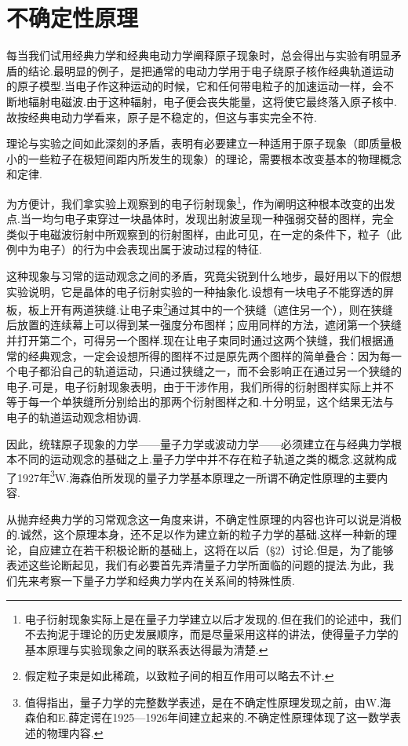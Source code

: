 \section{不确定性原理}

每当我们试用经典力学和经典电动力学阐释原子现象时，总会得出与实验有明显矛盾的结论.最明显的例子，是把通常的电动力学用于电子绕原子核作经典轨道运动的原子模型.当电子作这种运动的时候，它和任何带电粒子的加速运动一样，会不断地辐射电磁波.由于这种辐射，电子便会丧失能量，这将使它最终落入原子核中.故按经典电动力学看来，原子是不稳定的，但这与事实完全不符.

理论与实验之间如此深刻的矛盾，表明有必要建立一种适用于原子现象（即质量极小的一些粒子在极短间距内所发生的现象）的理论，需要根本改变基本的物理概念和定律.

为方便计，我们拿实验上观察到的电子衍射现象\footnote{电子衍射现象实际上是在量子力学建立以后才发现的.但在我们的论述中，我们不去拘泥于理论的历史发展顺序，而是尽量采用这样的讲法，使得量子力学的基本原理与实验现象之间的联系表达得最为清楚.}，作为阐明这种根本改变的出发点.当一均匀电子束穿过一块晶体时，发现出射波呈现一种强弱交替的图样，完全类似于电磁波衍射中所观察到的衍射图样，由此可见，在一定的条件下，粒子（此例中为电子）的行为中会表现出属于波动过程的特征.

这种现象与习常的运动观念之间的矛盾，究竟尖锐到什么地步，最好用以下的假想实验说明，它是晶体的电子衍射实验的一种抽象化.设想有一块电子不能穿透的屏板，板上开有两道狭缝.让电子束\footnote{假定粒子束是如此稀疏，以致粒子间的相互作用可以略去不计.}通过其中的一个狭缝（遮住另一个），则在狭缝后放置的连续幕上可以得到某一强度分布图样；应用同样的方法，遮闭第一个狭缝并打开第二个，可得另一个图样.现在让电子束同时通过这两个狭缝，我们根据通常的经典观念，一定会设想所得的图样不过是原先两个图样的简单叠合：因为每一个电子都沿自己的轨道运动，只通过狭缝之一，而不会影响正在通过另一个狭缝的电子.可是，电子衍射现象表明，由于干涉作用，我们所得的衍射图样实际上并不等于每一个单狭缝所分别给出的那两个衍射图样之和.十分明显，这个结果无法与电子的轨道运动观念相协调.

因此，统辖原子现象的力学——量子力学或波动力学——必须建立在与经典力学根本不同的运动观念的基础之上.量子力学中并不存在粒子轨道之类的概念.这就构成了1927年\footnote{值得指出，量子力学的完整数学表述，是在不确定性原理发现之前，由W.海森伯和E.薛定谔在1925—1926年间建立起来的.不确定性原理体现了这一数学表述的物理内容.}W.海森伯所发现的量子力学基本原理之一所谓不确定性原理的主要内容.

从抛弃经典力学的习常观念这一角度来讲，不确定性原理的内容也许可以说是消极的.诚然，这个原理本身，还不足以作为建立新的粒子力学的基础.这样一种新的理论，自应建立在若干积极论断的基础上，这将在以后（§2）讨论.但是，为了能够表述这些论断起见，我们有必要首先弄清量子力学所面临的问题的提法.为此，我们先来考察一下量子力学和经典力学内在关系间的特殊性质.


